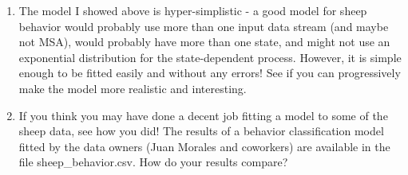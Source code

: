 \documentclass[12pt]{article}\usepackage[]{graphicx}\usepackage[]{color}
\begin{document}
\begin{enumerate}
\item The model I showed above is hyper-simplistic - a good model for sheep behavior would probably use more than one input data stream (and maybe not MSA), would probably have more than one state, and might not use an exponential distribution for the state-dependent process.  However, it is simple enough to be fitted easily and without any errors! See if you can progressively make the model more realistic and interesting.

\item If you think you may have done a decent job fitting a model to some of the sheep data, see how you did! The results of a behavior classification model fitted by the data owners (Juan Morales and coworkers) are available in the file sheep\_behavior.csv. How do your results compare?
\end{enumerate}


\end{document}
